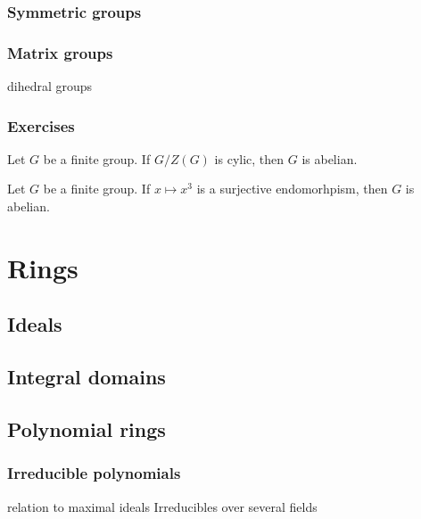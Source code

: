 \documentclass{../note}
\begin{document}
\section{Symmetric groups}
\section{Matrix groups}
dihedral groups



\section*{Exercises}

\begin{prb}
Let $G$ be a finite group.
If $G/Z(G)$ is cylic, then $G$ is abelian.
\end{prb}

\begin{prb}
Let $G$ be a finite group.
If $x\mapsto x^3$ is a surjective endomorhpism, then $G$ is abelian.
\end{prb}











\part{Rings}
\chapter{Ideals}
\chapter{Integral domains}


\chapter{Polynomial rings}
\section{Irreducible polynomials}
relation to maximal ideals
Irreducibles over several fields
\end{document}
